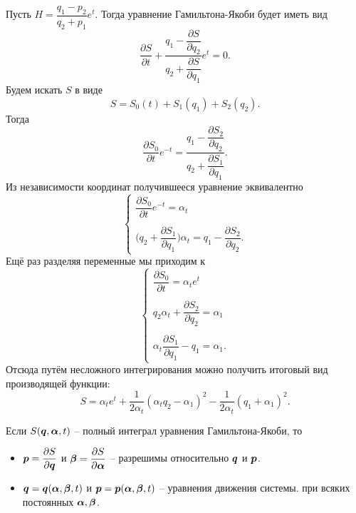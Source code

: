 \begin{example}
    Пусть $H = \dfrac{q_1 - p_2}{q_2 + p_1} e^t$.
    Тогда уравнение Гамильтона-Якоби будет иметь вид
    \[
        \dfrac{\partial S}{\partial t} + \dfrac{q_1 - \dfrac{\partial S}{\partial q_2}}{q_2 + \dfrac{\partial S}{\partial q_1}} e^t = 0.
    \]
    Будем искать $S$ в виде
    \[
        S = S_0(t) + S_1(q_1) + S_2(q_2).
    \]
    Тогда
    \[
        \dfrac{\partial S_0}{\partial t} e^{-t} = \dfrac{q_1 - \dfrac{\partial S_2}{\partial q_2}}{q_2 + \dfrac{\partial S_1}{\partial q_1}}.
    \]
    Из независимости координат получившееся уравнение эквивалентно
    \[
        \begin{cases}
            \dfrac{\partial S_0}{\partial t} e^{-t} = \alpha_t \\ \\
            \biggr(q_2 + \dfrac{\partial S_1}{\partial q_1} \biggr) \alpha_t = q_1 - \dfrac{\partial S_2}{\partial q_2}.
        \end{cases}
    \]
    Ещё раз разделяя переменные мы приходим к
    \[
        \begin{cases}
            \dfrac{\partial S_0}{\partial t} = \alpha_t e^t \\ \\
            q_2 \alpha_t + \dfrac{\partial S_2}{\partial q_2} = \alpha_1 \\ \\
            \alpha_t \dfrac{\partial S_1}{\partial q_1} - q_1 = \alpha_1.
        \end{cases}
    \]
    Отсюда путём несложного интегрирования можно получить итоговый вид производящей функции:
    \[
        S = \alpha_t e^t + \dfrac{1}{2\alpha_t}(\alpha_t q_2 - \alpha_1)^2 - \dfrac{1}{2\alpha_t}(q_1 + \alpha_1)^2.
    \]
\end{example}
\begin{theorem}[Якоби]
    Если $S(\boldsymbol{q}, \boldsymbol{\alpha}, t)$ -- полный интеграл уравнения Гамильтона-Якоби, то
    \begin{itemize}
        \item $\boldsymbol{p} = \dfrac{\partial S}{\partial \boldsymbol{q}}$ и $\boldsymbol{\beta} = \dfrac{\partial S}{\partial \boldsymbol{\alpha}}$ -- разрешимы относительно $\boldsymbol{q}$ и $\boldsymbol{p}$.
        \item $\boldsymbol{q} = \boldsymbol{q}(\boldsymbol{\alpha}, \boldsymbol{\beta}, t)$ и $\boldsymbol{p} = \boldsymbol{p}(\boldsymbol{\alpha}, \boldsymbol{\beta}, t)$ -- уравнения движения системы. при всяких постоянных $\boldsymbol{\alpha}, \boldsymbol{\beta}$.
    \end{itemize}
\end{theorem}
